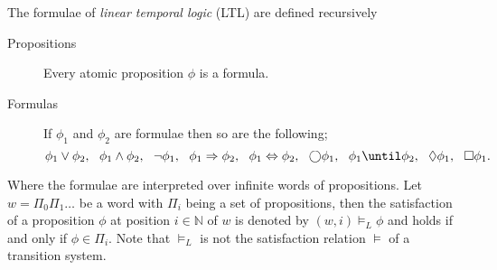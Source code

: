 \begin{defi}
The formulae of \emph{linear temporal logic} (LTL) are defined recursively
\begin{description}
    \item[Propositions]{Every atomic proposition $\phi$ is a formula.}
    \item[Formulas]{If $\phi_{1}$ and $\phi_{2}$ are formulae then so are the following;
        \[
        \phi_{1} \lor \phi_{2},\ \ \phi_{1} \land \phi_{2}, \ \ \lnot \phi_{1}, \ \
        \phi_{1} \Rightarrow \phi_{2},\ \ \phi_{1} \Leftrightarrow \phi_{2}, \ \ \bigcirc \phi_{1}, \ \ \phi_{1} \until \phi_{2}, \ \ \lozenge \phi_{1}, \ \ \square \phi_{1}.
        \]}
\end{description}
\end{defi}
Where the formulae are interpreted over infinite words of propositions. Let $w=\Pi_{0}\Pi_{1}\ldots$ be a word with $\Pi_{i}$ being a set of propositions, then the satisfaction of a proposition $\phi$ at position $i\in \mathbb{N}$ of $w$ is denoted by $(w,i)\models_{L} \phi$ and holds if and only if $\phi \in \Pi_{i}$. Note that $\models_{L}$ is not the satisfaction relation $\models$ of a transition system.

